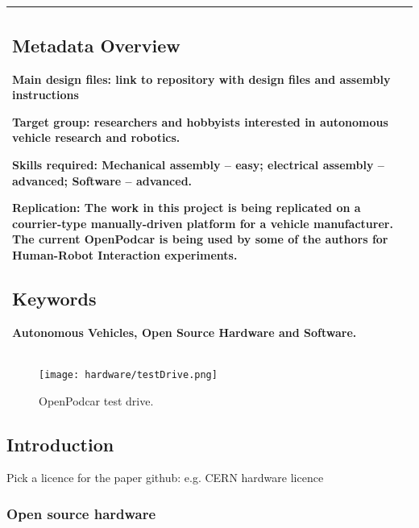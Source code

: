 \documentclass[a4paper]{article}
\begin{document}
\begin{longtable}[]{@{}l@{}}
\begin{minipage}[t]{0.97\columnwidth}\raggedright\strut


\subsection{Metadata Overview}\label{h.akaipbqoqfs8}

Main design files: link to repository with design files and assembly instructions

Target group: researchers and hobbyists interested in autonomous vehicle research and robotics. 

Skills required: Mechanical assembly – easy; electrical assembly – advanced; Software – advanced.

Replication: The work in this project is being replicated on a courrier-type manually-driven platform for a vehicle manufacturer. The current OpenPodcar is being used by some of the authors for Human-Robot Interaction experiments.



\subsection{Keywords}\label{h.kdz351yp7g7c}

{Autonomous Vehicles, Open Source Hardware and Software.}

\strut\end{minipage}\tabularnewline
\bottomrule
\end{longtable}

\begin{figure}[h]
	\texttt{[image: hardware/testDrive.png]}
	\caption{OpenPodcar test drive.}
	\label{fig:testDrive}
\end{figure}


\subsection{Introduction}\label{h.pnj38xyr5dyy}


Pick a licence for the paper github: e.g. CERN hardware licence

\subsubsection{Open source hardware}
\end{document}
